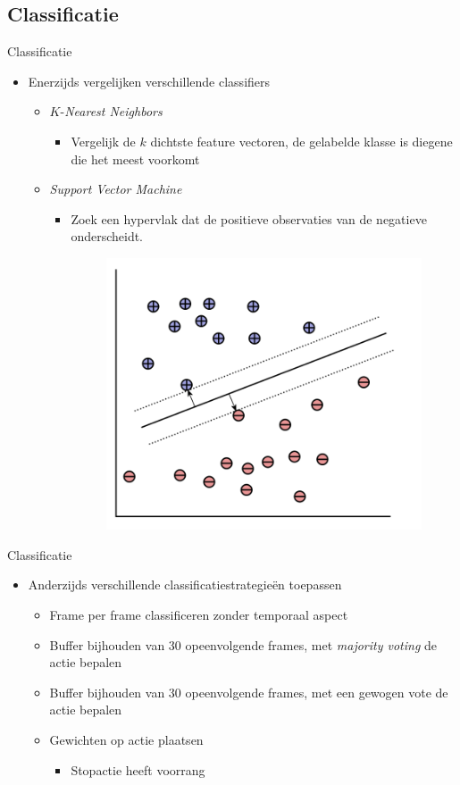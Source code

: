 \documentclass[]{beamer}
\begin{document}
	\subsection{Classificatie}
	\begin{frame}{Classificatie}
		\begin{itemize}
			\item Enerzijds vergelijken verschillende classifiers
			\begin{itemize}
				\item $K$-\textit{Nearest Neighbors}
				\begin{itemize}
					\item Vergelijk de $k$ dichtste feature vectoren, de gelabelde klasse is diegene die het meest voorkomt
				\end{itemize}
				\item \textit{Support Vector Machine}
				\begin{itemize}
					\item Zoek een hypervlak dat de positieve observaties van de negatieve onderscheidt.
					\begin{figure}[ht]
						\centering
						\includegraphics[width=0.5\linewidth]{svm}
					\end{figure}
				\end{itemize}

			\end{itemize}
		\end{itemize}
	\end{frame}
	\begin{frame}{Classificatie}
		\begin{itemize}
			\item Anderzijds verschillende classificatiestrategieën toepassen
			\begin{itemize}
				\item Frame per frame classificeren zonder temporaal aspect
				\item Buffer bijhouden van 30 opeenvolgende frames, met \textit{majority voting} de actie bepalen
				\item Buffer bijhouden van 30 opeenvolgende frames, met een gewogen vote de actie bepalen
				\item Gewichten op actie plaatsen
				\begin{itemize}
					\item Stopactie heeft voorrang
				\end{itemize}
		
			\end{itemize}
		\end{itemize}
	\end{frame}
\end{document}
